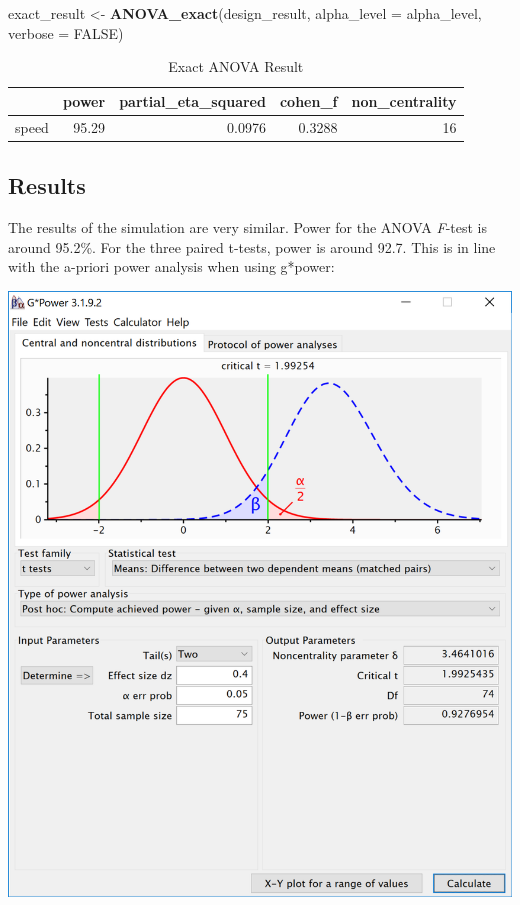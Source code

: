 \documentclass[]{book}
\newenvironment{Shaded}{\begin{snugshade}}{\end{snugshade}}
\newcommand{\DataTypeTok}[1]{\textcolor[rgb]{0.13,0.29,0.53}{#1}}
\newcommand{\KeywordTok}[1]{\textcolor[rgb]{0.13,0.29,0.53}{\textbf{#1}}}
\newcommand{\NormalTok}[1]{#1}
\newcommand{\OtherTok}[1]{\textcolor[rgb]{0.56,0.35,0.01}{#1}}
\newcommand{\StringTok}[1]{\textcolor[rgb]{0.31,0.60,0.02}{#1}}
\begin{document}
\begin{Shaded}
\begin{Highlighting}[]
\NormalTok{exact_result <-}\StringTok{ }\KeywordTok{ANOVA_exact}\NormalTok{(design_result,}
                            \DataTypeTok{alpha_level =}\NormalTok{ alpha_level,}
                            \DataTypeTok{verbose =} \OtherTok{FALSE}\NormalTok{)}
\end{Highlighting}
\end{Shaded}

\begin{table}[t]

\caption{\label{tab:unnamed-chunk-121}Exact ANOVA Result}
\centering
\begin{tabular}{l|r|r|r|r}
\hline
  & power & partial\_eta\_squared & cohen\_f & non\_centrality\\
\hline
speed & 95.29 & 0.0976 & 0.3288 & 16\\
\hline
\end{tabular}
\end{table}

\hypertarget{results}{%
\subsection{Results}\label{results}}

The results of the simulation are very similar. Power for the ANOVA \emph{F}-test is around 95.2\%. For the three paired t-tests, power is around 92.7. This is in line with the a-priori power analysis when using g*power:

\includegraphics{screenshots/gpower_2.png}
\end{document}
